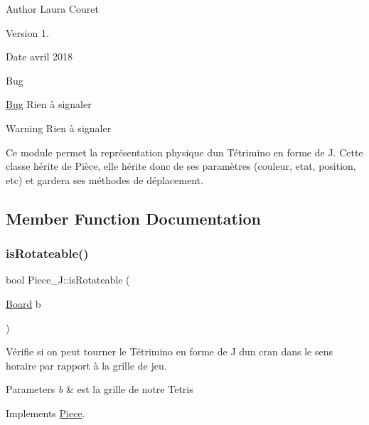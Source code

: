 \begin{DoxyAuthor}{Author}
Laura Couret 
\end{DoxyAuthor}
\begin{DoxyVersion}{Version}
1. 
\end{DoxyVersion}
\begin{DoxyDate}{Date}
avril 2018 
\end{DoxyDate}
\begin{DoxyRefDesc}{Bug}
\item[\hyperlink{bug__bug000010}{Bug}]Rien à signaler \end{DoxyRefDesc}
\begin{DoxyWarning}{Warning}
Rien à signaler
\end{DoxyWarning}
Ce module permet la représentation physique d\textquotesingle{}un Tétrimino en forme de J. Cette classe hérite de Pièce, elle hérite donc de ses paramètres (couleur, etat, position, etc) et gardera ses méthodes de déplacement. 

\subsection{Member Function Documentation}
\mbox{\label{classPiece__J_aee0abd6254be3a50a86ff5464bb459f8}} 
\subsubsection{\texorpdfstring{is\+Rotateable()}{isRotateable()}}
{\footnotesize\ttfamily bool Piece\+\_\+\+J\+::is\+Rotateable (\begin{DoxyParamCaption}\item[{\hyperlink{classBoard}{Board}}]{b }\end{DoxyParamCaption})\hspace{0.3cm}{\ttfamily [virtual]}}



Vérifie si on peut tourner le Tétrimino en forme de J d\textquotesingle{}un cran dans le sens horaire par rapport à la grille de jeu. 


\begin{DoxyParams}{Parameters}
{\em b} & est la grille de notre Tetris \\
\hline
\end{DoxyParams}


Implements \hyperlink{classPiece_a56cdf7f4234fe848a3e203b693b7a862}{Piece}.

